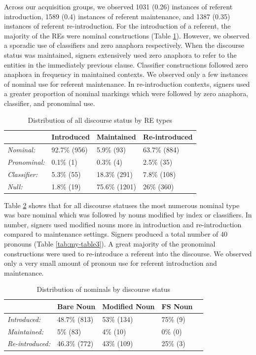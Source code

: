 \documentclass[]{elsarticle} %
\begin{document}
Across our acquisition groups, we observed 1031 (0.26) instances of
referent introduction, 1589 (0.4) instances of referent maintenance, and
1387 (0.35) instances of referent re-introduction. For the introduction
of a referent, the majority of the REs were nominal constructions (Table
\ref{tab:my-table}). However, we observed a sporadic use of classifiers
and zero anaphora respectively. When the discourse status was
maintained, signers extensively used zero anaphora to refer to the
entities in the immediately previous clause. Classifier constructions
followed zero anaphora in frequency in maintained contexts. We observed
only a few instances of nominal use for referent maintenance. In
re-introduction contexts, signers used a greater proportion of nominal
markings which were followed by zero anaphora, classifier, and
pronominal use.

\begin{table}
\small
\caption{Distribution of all discourse status by RE types}
\label{tab:my-table}
\begin{tabular}{llll}
\hline
                     & Introduced    & Maintained     & Re-introduced \\ \hline
\textit{Nominal:}    & 92.7\% (956) & 5.9\% (93)    & 63.7\% (884) \\
\textit{Pronominal:} & 0.1\% (1)    & 0.3\% (4)     & 2.5\% (35)   \\
\textit{Classifier:} & 5.3\% (55)   & 18.3\% (291)  & 7.8\% (108)     \\
\textit{Null:}       & 1.8\% (19)   & 75.6\% (1201) & 26\% (360) \\ \hline
\end{tabular}%
\end{table}

Table \ref{tab:my-table2} shows that for all discourse statuses the most
numerous nominal type was bare nominal which was followed by nouns
modified by index or classifiers. In number, signers used modified nouns
more in introduction and re-introduction compared to maintenance
settings. Signers produced a total number of 40 pronouns (Table
\ref{tab:my-table3}). A great majority of the pronominal constructions
were used to re-introduce a referent into the discourse. We observed
only a very small amount of pronoun use for referent introduction and
maintenance.

\begin{table}
\small
\caption{Distribution of nominals by discourse status}
\label{tab:my-table2}
\begin{tabular}{lllll}
\hline
                        & Bare Noun  & Modified Noun & FS Noun \\ \hline
\textit{Introduced:}    & 48.7\% (813) & 53\% (134)     & 75\% (9) \\
\textit{Maintained:}    & 5\% (83)  & 4\% (10)      & 0\% (0) \\
\textit{Re-introduced:} & 46.3\% (772) & 43\% (109)     & 25\% (3) \\ \hline
\end{tabular}
\end{table}
\end{document}
